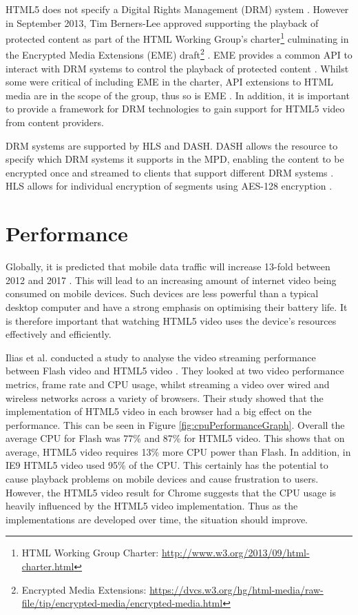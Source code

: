 \documentclass[journal]{IEEEtran}
\begin{document}
HTML5 does not specify a Digital Rights Management (DRM) system \cite{article:HTML5LeadsAWebRevolution}. However in September 2013, Tim Berners-Lee approved supporting the playback of protected content as part of the HTML Working Group's charter\footnote{HTML Working Group Charter: \url{http://www.w3.org/2013/09/html-charter.html}} culminating in the Encrypted Media Extensions (EME) draft\footnote{Encrypted Media Extensions: \url{https://dvcs.w3.org/hg/html-media/raw-file/tip/encrypted-media/encrypted-media.html}} \cite{email:newHTMLCharter}. EME provides a common API to interact with DRM systems to control the playback of protected content \cite{standard:eme}. Whilst some were critical of including EME in the charter, API extensions to HTML media are in the scope of the group, thus so is EME \cite{website:EEFDRM}\cite{email:emeInScope}. In addition, it is important to provide a framework for DRM technologies to gain support for HTML5 video from content providers.

DRM systems are supported by HLS and DASH. DASH allows the resource to specify which DRM systems it supports in the MPD, enabling the content to be encrypted once and streamed to clients that support different DRM systems \cite{article:MPEGDASH}. HLS allows for individual encryption of segments using AES-128 encryption \cite{techreport:aReviewOfHTTPLiveStreaming}.

\section{Performance}
Globally, it is predicted that mobile data traffic will increase 13-fold between 2012 and 2017 \cite{website:ciscoForecastAndMethodology}. This will lead to an increasing amount of internet video being consumed on mobile devices. Such devices are less powerful than a typical desktop computer and  have a strong emphasis on optimising their battery life. It is therefore important that watching HTML5 video uses the device's resources effectively and efficiently. %

Ilias et al. conducted a study to analyse the video streaming performance between Flash video and HTML5 video \cite{inproceedings:aStudyOfVideoPerformanceAnalysis}. They looked at two video performance metrics, frame rate and CPU usage, whilst streaming a video over wired and wireless networks across a variety of browsers. Their study showed that the implementation of HTML5 video in each browser had a big effect on the performance. This can be seen in Figure \ref{fig:cpuPerformanceGraph}. Overall the average CPU for Flash was 77\% and 87\% for HTML5 video. This shows that on average, HTML5 video requires 13\% more CPU power than Flash. In addition, in IE9 HTML5 video used 95\% of the CPU. This certainly has the potential to cause playback problems on mobile devices and cause frustration to users. However, the HTML5 video result for Chrome suggests that the CPU usage is heavily influenced by the HTML5 video implementation. Thus as the implementations are developed over time, the situation should improve.
\end{document}
